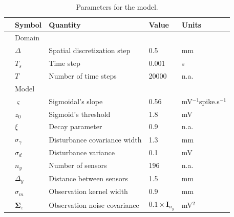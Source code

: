 \documentclass[10pt,twocolumn,twoside]{IEEEtran}
\begin{document}
\begin {table}[t]
\begin{center}
	{\tiny\begin{tabular}{lllll}
	\hline \hline
	& Symbol & Quantity &Value& Units\\ 
	\hline 
	& Domain&&& \\
	& $\Delta$ &Spatial discretization step&0.5&mm \\ 
 	& $T_s$ &Time step&0.001&s \\ 
 	& $T$ &Number of time steps&20000&n.a. \\ 
 	&Model&&& \\
 	& $\varsigma$ &Sigmoidal's slope&0.56&mV$^{-1}$spike.s$^{-1}$ \\ 
 	& $z_0$ &Sigmoid's threshold &1.8&mV \\ 
 	& $\xi$ &Decay parameter&0.9 &n.a. \\  
  & $\sigma_{\gamma}$ &Disturbance covariance width&1.3 &mm \\  
  & $\sigma_{d}$ &Disturbance variance&0.1 &mV \\  
  & $n_{y}$ &Number of sensors&196 &n.a. \\  
  & $\Delta_{y}$ &Distance between sensors&1.5 &mm \\  
  & $\sigma_{m}$ &Observation kernel width&0.9 &mm \\  
  & $\boldsymbol\Sigma_{\varepsilon}$ &Observation noise covariance&$0.1\times\mathbf{I}_{n_y}$ &mV$^2$ \\  
 	\hline \hline
	\end{tabular}}
 \caption {Parameters for the model. } 
 \label{table:SimulationParameters}
 \end{center}
 \end {table}
\end{document}
